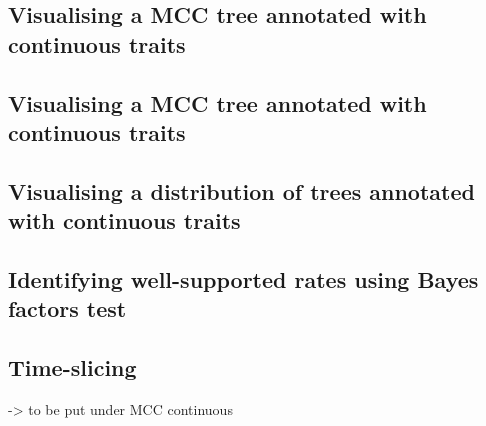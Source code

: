 \documentclass[english]{paper}
\begin{document}
\subsection{Visualising a MCC tree annotated with continuous traits}
% 

\subsection{Visualising a MCC tree annotated with continuous traits}
\label{JSONmerge}


\subsection{Visualising a distribution of trees annotated with continuous traits}


\subsection{Identifying well-supported rates using Bayes factors test}

% 
%
\subsection{Time-slicing}
-> to be put under MCC continuous 

% 
% 
\end{document}

